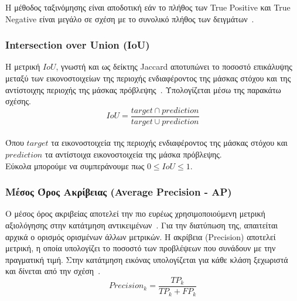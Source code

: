 \documentclass[12pt]{article}
\numberwithin{equation}{section}
\begin{document}
\noindent Η μέθοδος ταξινόμησης είναι αποδοτική εάν το πλήθος των True Positive και True Negative είναι μεγάλο σε σχέση με το συνολικό πλήθος των δειγμάτων~\cite{bhandari2025confusion}. 


\subsubsection{Intersection over Union (IoU)}

Η μετρική \(IoU\), γνωστή και ως δείκτης Jaccard αποτυπώνει το ποσοστό επικάλυψης μεταξύ των εικονοστοιχείων της περιοχής ενδιαφέροντος της μάσκας στόχου και της αντίστοιχης περιοχής της μάσκας πρόβλεψης~\cite{elharrouss2021panopticsegmentationreview}. Υπολογίζεται μέσω της παρακάτω σχέσης.\\

\begin{equation}
    IoU = \frac{target \cap prediction}{target \cup prediction}
\end{equation}
\\

\noindent Όπου \(target\) τα εικονοστοιχεία της περιοχής ενδιαφέροντος της μάσκας στόχου και \(prediction\) τα αντίστοιχα εικονοστοιχεία της μάσκα πρόβλεψης.\\

\noindent Εύκολα μπορούμε να συμπεράνουμε πως \(0 \leq IoU \leq 1\).\\

\subsubsection{Μέσος Όρος Ακρίβειας (Average Precision - AP)}

Ο μέσος όρος ακριβείας αποτελεί την πιο ευρέως χρησιμοποιούμενη μετρική αξιολόγησης στην κατάτμηση αντικειμένων~\cite{Kookna2022Segmentation}. Για την διατύπωση της, απαιτείται αρχικά ο ορισμός ορισμένων άλλων μετρικών. Η ακρίβεια (Precision) αποτελεί μετρική, η οποία υπολογίζει το ποσοστό των προβλέψεων που συνάδουν με την πραγματική τιμή. Στην κατάτμηση εικόνας υπολογίζεται για κάθε κλάση ξεχωριστά~\cite{Bex2021MulticlassMetrics} και δίνεται από την σχέση~\cite{grandini2020metricsmulticlassclassificationoverview}. \\

\begin{equation}
Precision_k = \frac{TP_k}{TP_k + FP_k}
\end{equation}\\
\end{document}
